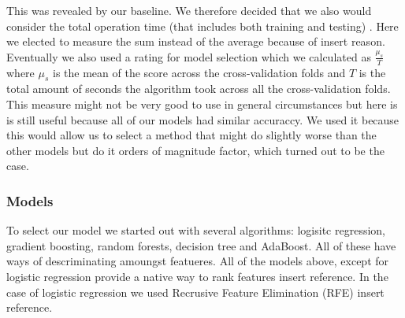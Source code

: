 \documentclass[british]{article}
\begin{document}
 This was revealed by our baseline. We therefore decided that we also would consider the total operation time (that includes both training and testing) . Here we elected to measure the sum instead of the average because of {\color{red} insert reason}. Eventually we also used a rating for model selection which we calculated as $\frac{\mu_s}{T}$ where $\mu_s$ is the mean of the score across the cross-validation folds and $T$ is the total amount of seconds the algorithm took across all the cross-validation folds. This measure might not be very good to use in general circumstances but here is is still useful because all of our models had similar accuraccy. We used it because this would allow us to select a method that might do slightly worse than the other models but do it orders of magnitude factor, which turned out to be the case. 

\subsubsection{Models}
To select our model we started out with several algorithms: logisitc regression, gradient boosting, random forests, decision tree and AdaBoost. All of these have ways of descriminating amoungst featueres. All of the models above, except for logistic regression provide a native way to rank features {\color{red} insert reference}. In the case of logistic regression we used Recrusive Feature Elimination (RFE){\color{red} insert reference}. 
\end{document}
